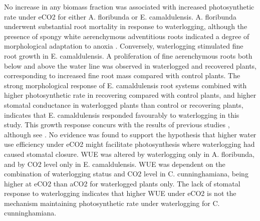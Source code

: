 \documentclass[12pt,a4paper]{memoir}
\begin{document}
No increase in any biomass fraction was associated with increased photosynthetic rate under eCO2 for either A. floribunda or E. camaldulensis. A. floribunda underwent substantial root mortality in response to waterlogging, although the presence of spongy white aerenchymous adventitious roots indicated a degree of morphological adaptation to anoxia \cite{Evans2004}. Conversely, waterlogging stimulated fine root growth in E. camaldulensis. A proliferation of fine aerenchymous roots both below and above the water line was observed in waterlogged and recovered plants, corresponding to increased fine root mass compared with control plants. The strong morphological response of E. camaldulensis root systems combined with higher photosynthetic rate in recovering compared with control plants, and higher stomatal conductance in waterlogged plants than control or recovering plants, indicates that E. camaldulensis responded favourably to waterlogging in this study. This growth response concurs with the results of previous studies \cite{Sena-Gomes1980, Marcar1993}, although see \cite{Kogawara2006}. No evidence was found to support the hypothesis that higher water use efficiency under eCO2 might facilitate photosynthesis where waterlogging had caused stomatal closure. WUE was altered by waterlogging only in A. floribunda, and by CO2 level only in E. camaldulensis. WUE was dependent on the combination of waterlogging status and CO2 level in C. cunninghamiana, being higher at eCO2 than aCO2 for waterlogged plants only. The lack of stomatal response to waterlogging indicates that higher WUE under eCO2 is not the mechanism maintaining photosynthetic rate under waterlogging for C. cunninghamiana. 
\end{document}
